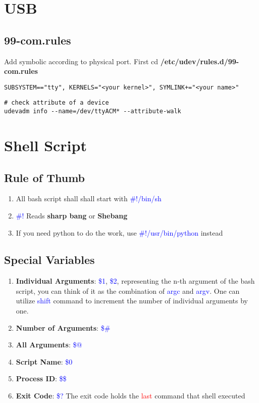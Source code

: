 \documentclass[12pt,a4paper]{article}
\newcommand{\rt}[1]{\textcolor{red}{#1}}
\newcommand{\bt}[1]{\textcolor{blue}{#1}}
\begin{document}
\section{USB}

\subsection{99-com.rules}
Add symbolic according to physical port. First cd \textbf{/etc/udev/rules.d/99-com.rules}
\begin{footnotesize}
\begin{verbatim}
SUBSYSTEM=="tty", KERNELS="<your kernel>", SYMLINK+="<your name>"
\end{verbatim}
\end{footnotesize}

\begin{footnotesize}
\begin{verbatim}
# check attribute of a device
udevadm info --name=/dev/ttyACM* --attribute-walk
\end{verbatim}
\end{footnotesize}

\section{Shell Script}
\subsection{Rule of Thumb}
\begin{enumerate}
	\item All bash script shall shall start with \bt{\#!/bin/sh}
	\item \bt{\#!} Reads \textbf{sharp bang} or \textbf{Shebang}
	\item If you need python to do the work, use \bt{\#!/usr/bin/python} instead
\end{enumerate}

\subsection{Special Variables}
\begin{enumerate}
	\item \textbf{Individual Arguments}: \bt{\$1}, \bt{\$2}, representing the n-th argument of the bash script, you can think of it as the combination of \bt{argc} and \bt{argv}. One can utilize \bt{shift} command to increment the number of individual arguments by one.
	\item \textbf{Number of Arguments}: \bt{\$\#}
	\item \textbf{All Arguments}: \bt{\$@}
	\item \textbf{Script Name}: \bt{\$0}
	\item \textbf{Process ID}: \bt{\$\$}
	\item \textbf{Exit Code}: \bt{\$?} The exit code holds the \rt{last} command that shell executed
\end{enumerate}
\end{document}
